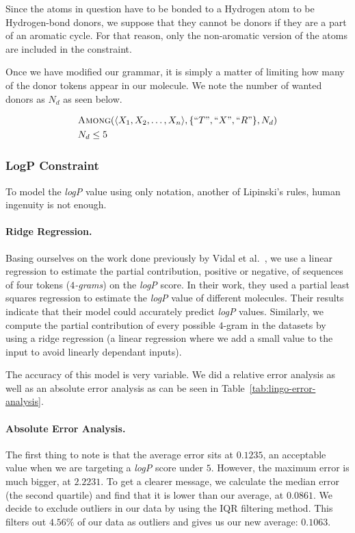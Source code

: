 \documentclass[../Document.tex]{subfiles}
\begin{document}
Since the atoms in question have to be bonded to a Hydrogen atom to be Hydrogen-bond donors, we suppose that they cannot be donors if they are a part of an aromatic cycle. For that reason, only the non-aromatic version of the atoms are included in the constraint.

Once we have modified our grammar, it is simply a matter of limiting how many of the donor tokens appear in our molecule. We note the number of wanted donors as $N_d$ as seen below.

\begin{align*}
    &\mbox{\sc Among}(\langle X_1, X_2, \ldots, X_n \rangle, \{``T",``X",``R"\}, N_d)\\
    &N_d \leq 5
\end{align*}


\subsubsection{LogP Constraint}
To model the \emph{logP} value using only \smiles notation, another of Lipinski's rules, human ingenuity is not enough.

\paragraph{Ridge Regression.}
Basing ourselves on the work done previously by Vidal et al.~\cite{lingos}, we use a linear regression to estimate the partial contribution, positive or negative, of sequences of four tokens (\emph{$4$-grams}) on the \emph{logP} score.
In their work, they used a partial least squares regression to estimate the \emph{logP} value of different molecules.
Their results indicate that their model could accurately predict \emph{logP} values.
Similarly, we compute the partial contribution of every possible $4$-gram in the datasets by using a ridge regression (a linear regression where we add a small value to the input to avoid linearly dependant inputs).

The accuracy of this model is very variable. We did a relative error analysis as well as an absolute error analysis as can be seen in Table~\ref{tab:lingo-error-analysis}.

\paragraph{Absolute Error Analysis.} The first thing to note is that the average error sits at $0.1235$, an acceptable value when we are targeting a \emph{logP} score under $5$. However, the maximum error is much bigger, at $2.2231$. To get a clearer message, we calculate the median error (\ie the second quartile) and find that it is lower than our average, at $0.0861$. We decide to exclude outliers in our data by using the IQR filtering method. This filters out $4.56\%$ of our data as outliers and gives us our new average: $0.1063$.
\end{document}
